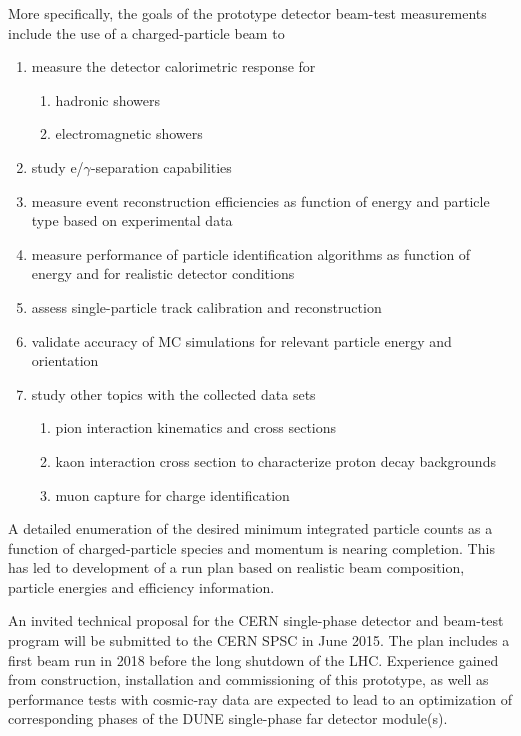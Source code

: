 More specifically, the goals of the prototype detector beam-test measurements include
the use of a charged-particle beam to
\begin{enumerate}
\item measure the detector calorimetric response for
\begin{enumerate}
	\item hadronic showers
	\item electromagnetic showers
\end{enumerate}
\item study e/$\gamma$-separation capabilities
\item measure event reconstruction efficiencies as function of energy and particle type based on experimental data
\item measure performance of particle identification algorithms as function of energy and for realistic detector conditions
\item assess single-particle track calibration and reconstruction
\item validate accuracy of MC simulations for relevant particle energy and orientation %
\item study other topics with the collected data sets
 \begin{enumerate}
    \item pion interaction kinematics and cross sections
    \item kaon interaction cross section to characterize proton decay backgrounds
    \item muon capture for charge identification
 \end{enumerate}
\end{enumerate}
A detailed enumeration of the desired minimum integrated particle
counts as a function of charged-particle species and momentum is
nearing completion. This has led to development of a run plan based on
realistic beam composition, particle energies and efficiency
information.

An invited technical proposal for the CERN single-phase detector and
beam-test program\cite{CERN_single-phase_proposal} will be submitted
to the CERN SPSC in June 2015. The plan includes a first beam run in
2018 before the long shutdown of the LHC. Experience gained from
construction, installation and commissioning of this prototype, as
well as performance tests with cosmic-ray data are expected to lead to
an optimization of corresponding phases of the DUNE single-phase far
detector module(s).

